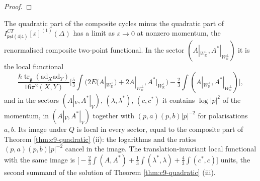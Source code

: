 \begin{proof}
\end{proof}

\begin{remark}
\label{rem:c9-Pi}
The quadratic part of the composite cycles minus the quadratic part of $I^{CT}_{\mathfrak{psl}(4|4)}[\varepsilon]^{(1)}(\Delta)$ has a limit as $\varepsilon\to0$ at nonzero momentum, the renormalised composite two-point functional. In the sector $(A|_{W_{\mathbb R}^\perp},A^*|_{W_{\mathbb R}^\perp})$ it is the local functional
\[
\frac{\hbar\operatorname{tr}_{\mathfrak g}(\mathrm{ad}_X\mathrm{ad}_Y)}{16\pi^2(X,Y)}\Big[\tfrac53\int\big(2E(A|_{W_{\mathbb R}^\perp})+2A|_{W_{\mathbb R}^\perp},A^*|_{W_{\mathbb R}^\perp}\big)-\tfrac23\int(A|_{W_{\mathbb R}^\perp},A^*|_{W_{\mathbb R}^\perp})\Big],
\]
and in the sectors $(A|_V,A^*|_V)$, $(\lambda,\lambda^*)$, $(c,c^*)$ it contains $\log|p|^2$ of the momentum, in $(A|_V,A^*|_V)$ together with $(p,a)(p,b)|p|^{-2}$ for polarisations $a,b$. Its image under $Q$ is local in every sector, equal to the composite part of Theorem \ref{thm:c9-quadratic} (ii): the logarithms and the ratios $(p,a)(p,b)|p|^{-2}$ cancel in the image. The translation-invariant local functional with the same image is $\big[-\tfrac23\int(A,A^*)+\tfrac13\int(\lambda^*,\lambda)+\tfrac43\int(c^*,c)\big]$ units, the second summand of the solution of Theorem \ref{thm:c9-quadratic} (iii).
\end{remark}

